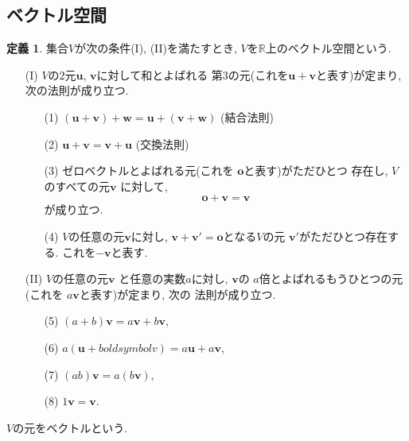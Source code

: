 \documentclass[a4j,12pt]{jarticle}
\theoremstyle{definition}
\newtheorem{definition}[theorem]{定義}
\begin{document}
\subsection{ベクトル空間}\label{def:vector space}
\begin{definition}
    集合$V$が次の条件(I), (II)を満たすとき, 
    $V$を$\mathbb{R}$上のベクトル空間という. 
    \begin{itemize}
        \item[(I)]$V$の$2$元$\boldsymbol{u}$, 
        $\boldsymbol{v}$に対して和とよばれる
        第$3$の元(これを$\boldsymbol{u}+
        \boldsymbol{v}$と表す)が定まり, 
        次の法則が成り立つ.  
        \begin{itemize}
            \item[(1)]
            $(\boldsymbol{u}+
            \boldsymbol{v})+\boldsymbol{w}=
            \boldsymbol{u}+
            (\boldsymbol{v}+\boldsymbol{w})$ 
            (結合法則)
            \item[(2)]
            $\boldsymbol{u}+
            \boldsymbol{v}=
            \boldsymbol{v}+
            \boldsymbol{u}$ 
            (交換法則)
            \item[(3)]
            ゼロベクトルとよばれる元(これを
            $\boldsymbol{o}$と表す)がただひとつ
            存在し, $V$のすべての元$\boldsymbol{v}$
            に対して, 
            $$\boldsymbol{o}+\boldsymbol{v}=
            \boldsymbol{v}$$
            が成り立つ. 
            \item[(4)]
            $V$の任意の元$\boldsymbol{v}$に対し, 
            $\boldsymbol{v}+\boldsymbol{v'}=
            \boldsymbol{o}$となる$V$の元
            $\boldsymbol{v'}$がただひとつ存在する. 
            これを$-\boldsymbol{v}$と表す. 
        \end{itemize} 
        \item[(II)]$V$の任意の元$\boldsymbol{v}$
        と任意の実数$a$に対し, $\boldsymbol{v}$の
        $a$倍とよばれるもうひとつの元(これを
        $a\boldsymbol{v}$と表す)が定まり, 次の
        法則が成り立つ. 
        \begin{itemize}
            \item[(5)]
            $(a+b)\boldsymbol{v}=
            a\boldsymbol{v}+
            b\boldsymbol{v}$,\ 
            \item[(6)]
            $a(\boldsymbol{u}+boldsymbol{v})=
            a\boldsymbol{u}+a\boldsymbol{v}$,\ 
            \item[(7)]
            $(ab)\boldsymbol{v}=a(b\boldsymbol{v})$,\ 
            \item[(8)]
            $1\boldsymbol{v}=\boldsymbol{v}$. 
        \end{itemize}
    \end{itemize}
    $V$の元をベクトルという. 
\end{definition}
\end{document}
